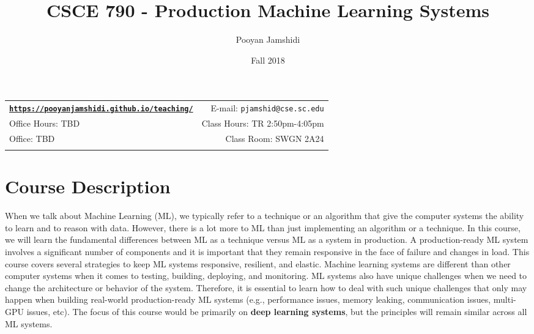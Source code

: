 \documentclass[11pt]{article}
\title{CSCE 790 - Production Machine Learning Systems}
\author{Pooyan Jamshidi}
\date{Fall 2018}
\newcommand{\blankline}{\quad\pagebreak[2]}
\begin{document}
\maketitle

\blankline

\begin{tabular*}{.93\textwidth}{@{\extracolsep{\fill}}lr}


\href{https://pooyanjamshidi.github.io/teaching/}{\tt\bf https://pooyanjamshidi.github.io/teaching/}  & E-mail: \texttt{pjamshid@cse.sc.edu} \\

 Office Hours: TBD  &  Class Hours: TR 2:50pm-4:05pm \\


 Office: TBD & Class Room: SWGN 2A24 \\
&  \\

\hline
\end{tabular*}

\vspace{10mm}

\section*{Course Description}

When we talk about Machine Learning (ML), we typically refer to a technique or an algorithm that give the computer systems the ability to learn and to reason with data. However, there is a lot more to ML than just implementing an algorithm or a technique. In this course, we will learn the fundamental differences between ML as a technique versus ML as a system in production. A production-ready ML system involves a significant number of components and it is important that they remain responsive in the face of failure and changes in load. This course covers several strategies to keep ML systems responsive, resilient, and elastic. Machine learning systems are different than other computer systems when it comes to testing, building, deploying, and monitoring. ML systems also have unique challenges when we need to change the architecture or behavior of the system. Therefore, it is essential to learn how to deal with such unique challenges that only may happen when building real-world production-ready ML systems (e.g., performance issues, memory leaking, communication issues, multi-GPU issues, etc). The focus of this course would be primarily on \textbf{deep learning systems}, but the principles will remain similar across all ML systems. 
\end{document}
